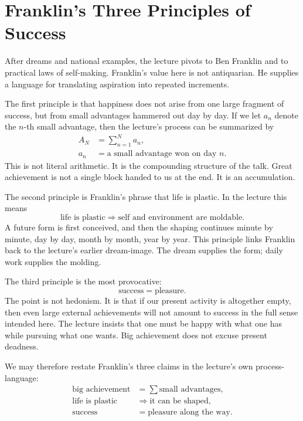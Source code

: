\section{Franklin's Three Principles of Success}

After dreams and national examples, the lecture pivots to Ben Franklin and to practical laws of self-making. Franklin's value here is not antiquarian. He supplies a language for translating aspiration into repeated increments.

The first principle is that happiness does not arise from one large fragment of success, but from small advantages hammered out day by day. If we let \(a_n\) denote the \(n\)-th small advantage, then the lecture's process can be summarized by
\begin{align}
A_N &= \sum_{n=1}^{N} a_n,\\
a_n &= \text{a small advantage won on day }n.
\end{align}
This is not literal arithmetic. It is the compounding structure of the talk. Great achievement is not a single block handed to us at the end. It is an accumulation.

The second principle is Franklin's phrase that life is plastic. In the lecture this means
\begin{equation}
\text{life is plastic}\Rightarrow \text{self and environment are moldable}.
\end{equation}
A future form is first conceived, and then the shaping continues minute by minute, day by day, month by month, year by year. This principle links Franklin back to the lecture's earlier dream-image. The dream supplies the form; daily work supplies the molding.

The third principle is the most provocative:
\begin{equation}
\text{success}=\text{pleasure}.
\end{equation}
The point is not hedonism. It is that if our present activity is altogether empty, then even large external achievements will not amount to success in the full sense intended here. The lecture insists that one must be happy with what one has while pursuing what one wants. Big achievement does not excuse present deadness.

We may therefore restate Franklin's three claims in the lecture's own process-language:
\begin{align}
\text{big achievement} &= \sum \text{small advantages},\\
\text{life is plastic} &\Rightarrow \text{it can be shaped},\\
\text{success} &= \text{pleasure along the way}.
\end{align}

